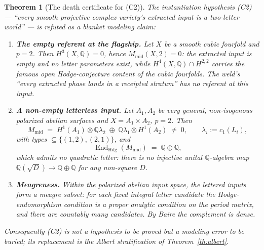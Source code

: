 \documentclass[11pt]{article}
\newcommand{\Q}{\mathbb Q}
\newcommand{\End}{\operatorname{End}}
\newcommand{\Hdg}{\operatorname{Hdg}}
\newtheorem{theorem}{Theorem}[section]
\begin{document}
\begin{theorem}[The death certificate for (C2)]
\label{th:death}
The instantiation hypothesis (C2) --- ``every smooth projective complex
variety's extracted input is a two-letter world'' --- is refuted as a
blanket modeling claim:
\begin{enumerate}[label=(\roman*)]
\item \textbf{The empty referent at the flagship.} Let $X$ be a smooth
cubic fourfold and $p=2$. Then $H^3(X,\Q)=0$, hence
$M_{\mathrm{mid}}(X,2)=0$: the extracted input is \emph{empty} and no
letter parameters exist, while $H^4(X,\Q)\cap H^{2,2}$ carries the
famous open Hodge-conjecture content of the cubic fourfolds. The weld's
``every extracted phase lands in a receipted stratum'' has no referent
at this input.
\item \textbf{A non-empty letterless input.} Let $A_1,A_2$ be very
general, non-isogenous polarized abelian surfaces and $X=A_1\times
A_2$, $p=2$. Then
\[
M_{\mathrm{mid}} \;=\; H^1(A_1)\otimes \Q\lambda_2 \;\oplus\;
\Q\lambda_1\otimes H^1(A_2) \;\neq\; 0,
\qquad \lambda_i := c_1(L_i),
\]
with types $\subseteq\{(1,2),(2,1)\}$, and
\[
\End_{\Hdg}(M_{\mathrm{mid}}) \;=\; \Q\oplus\Q,
\]
which admits \emph{no} quadratic letter: there is no injective unital
$\Q$-algebra map $\Q(\sqrt D)\to\Q\oplus\Q$ for any non-square $D$.
\item \textbf{Meagreness.} Within the polarized abelian input space,
the lettered inputs form a meagre subset: for each fixed integral
letter candidate the Hodge-endomorphism condition is a proper analytic
condition on the period matrix, and there are countably many
candidates. By Baire the complement is dense.
\end{enumerate}
Consequently (C2) is not a hypothesis to be proved but a modeling
error to be buried; its replacement is the Albert stratification of
Theorem~\ref{th:albert}.
\end{theorem}
\end{document}
